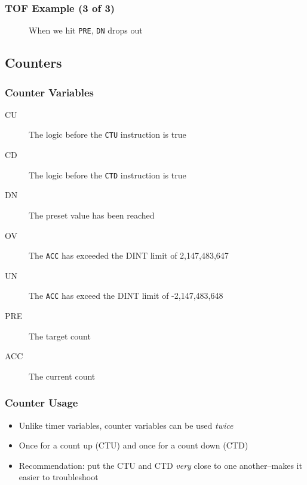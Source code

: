 \begin{frame}
    \frametitle{TOF Example (3 of 3)}

    \begin{figure}
        \centering
        \resizebox{0.875\linewidth}{!}{
            
        }

        \vspace{0.5em}
        {\footnotesize When we hit \texttt{PRE}, \texttt{DN} drops out\par}
    \end{figure}
\end{frame}

\subsection{Counters}

\begin{frame}
    \frametitle{Counter Variables}

    \begin{description}
        \item[CU] The logic before the \texttt{CTU} instruction is true
        \item[CD] The logic before the \texttt{CTD} instruction is true
        \item[DN] The preset value has been reached
        \item[OV] The \texttt{ACC} has exceeded the DINT limit of 2,147,483,647
        \item[UN] The \texttt{ACC} has exceed the DINT limit of -2,147,483,648 
        \item[PRE] The target count
        \item[ACC] The current count
    \end{description}
\end{frame}

\begin{frame}
    \frametitle{Counter Usage}

    \begin{itemize}
        \item Unlike timer variables, counter variables can be used \emph{twice}
        \item Once for a count up (CTU) and once for a count down (CTD)
        \item Recommendation: put the CTU and CTD \emph{very} close to one another--makes it easier to troubleshoot
    \end{itemize}
\end{frame}

